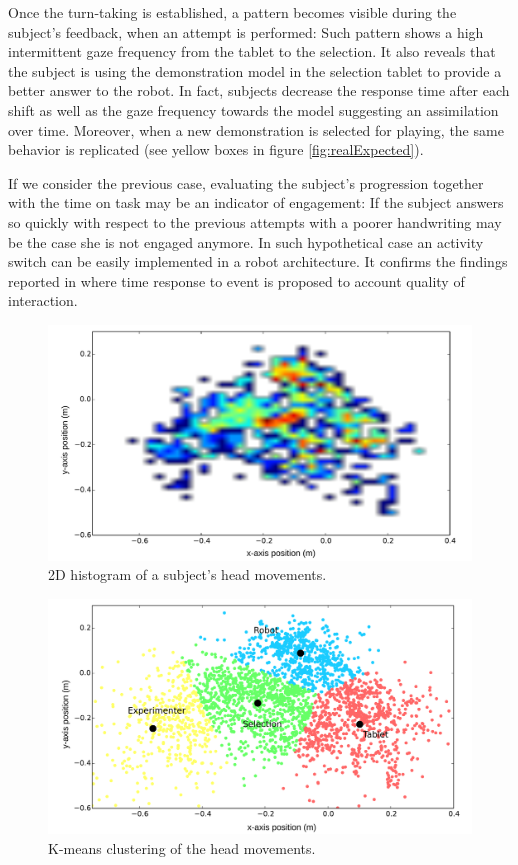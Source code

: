 \documentclass{sig-alternate}
\begin{document}
Once the turn-taking is established, a pattern becomes visible during the subject's feedback, when an attempt is performed: Such pattern shows a high intermittent gaze frequency from the tablet to the selection. It also reveals that the subject is using the demonstration model in the selection tablet to provide a better answer to the robot. In fact, subjects decrease the response time after each shift as well as the gaze frequency towards the model suggesting an assimilation over time. Moreover, when a new demonstration is selected for playing, the same behavior is replicated (see yellow boxes in figure \ref{fig:realExpected}).

If we consider the previous case, evaluating the subject's progression together with the time on task may be an indicator of engagement: If the subject answers so quickly with respect to the previous attempts with a poorer handwriting may be the case she is not engaged anymore. In such hypothetical case an activity switch can be easily implemented in a robot architecture. It confirms the findings reported in \cite{anzalone} where time response to event is proposed to account quality of interaction. 

\begin{figure}[h!]
    \centering
    \includegraphics[width=0.9\columnwidth]{heatmap}
    \caption{\small 2D histogram of a subject's head movements.}
    \label{heatmap}
\end{figure}

\begin{figure}[h!]
    \centering
    \includegraphics[width=0.9\columnwidth]{kmeans}
    \caption{\small K-means clustering of the head movements.}
    \label{kmeans}
\end{figure}
        
\end{document}
